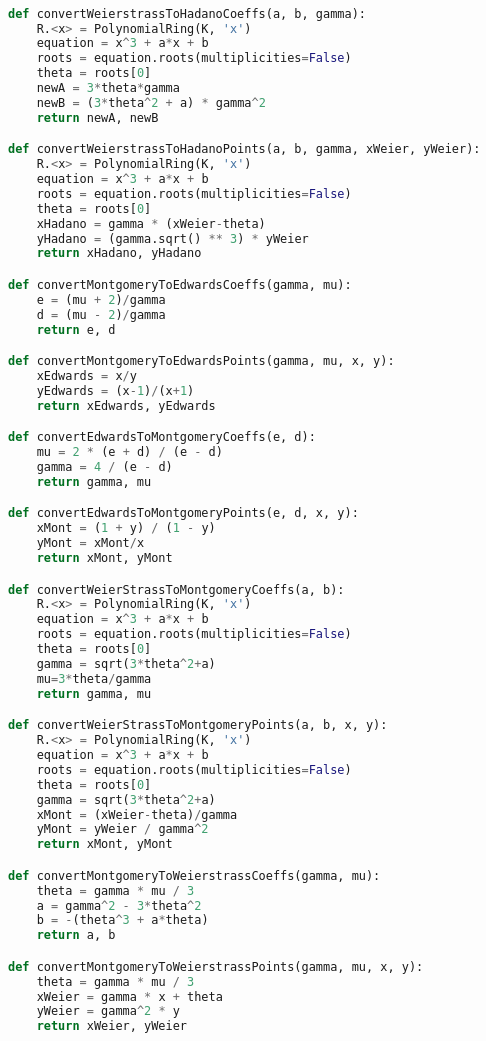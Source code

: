 \begin{lstlisting}[language=python]

def convertWeierstrassToHadanoCoeffs(a, b, gamma):
    R.<x> = PolynomialRing(K, 'x')
    equation = x^3 + a*x + b
    roots = equation.roots(multiplicities=False)
    theta = roots[0]
    newA = 3*theta*gamma
    newB = (3*theta^2 + a) * gamma^2
    return newA, newB

def convertWeierstrassToHadanoPoints(a, b, gamma, xWeier, yWeier):
    R.<x> = PolynomialRing(K, 'x')
    equation = x^3 + a*x + b
    roots = equation.roots(multiplicities=False)
    theta = roots[0]
    xHadano = gamma * (xWeier-theta)
    yHadano = (gamma.sqrt() ** 3) * yWeier
    return xHadano, yHadano

def convertMontgomeryToEdwardsCoeffs(gamma, mu):
    e = (mu + 2)/gamma
    d = (mu - 2)/gamma
    return e, d

def convertMontgomeryToEdwardsPoints(gamma, mu, x, y):
    xEdwards = x/y
    yEdwards = (x-1)/(x+1)
    return xEdwards, yEdwards

def convertEdwardsToMontgomeryCoeffs(e, d):
    mu = 2 * (e + d) / (e - d)
    gamma = 4 / (e - d)
    return gamma, mu

def convertEdwardsToMontgomeryPoints(e, d, x, y):
    xMont = (1 + y) / (1 - y)
    yMont = xMont/x
    return xMont, yMont

def convertWeierStrassToMontgomeryCoeffs(a, b):
    R.<x> = PolynomialRing(K, 'x')
    equation = x^3 + a*x + b
    roots = equation.roots(multiplicities=False)
    theta = roots[0]
    gamma = sqrt(3*theta^2+a)
    mu=3*theta/gamma
    return gamma, mu

def convertWeierStrassToMontgomeryPoints(a, b, x, y):
    R.<x> = PolynomialRing(K, 'x')
    equation = x^3 + a*x + b
    roots = equation.roots(multiplicities=False)
    theta = roots[0]
    gamma = sqrt(3*theta^2+a)
    xMont = (xWeier-theta)/gamma
    yMont = yWeier / gamma^2
    return xMont, yMont

def convertMontgomeryToWeierstrassCoeffs(gamma, mu):
    theta = gamma * mu / 3
    a = gamma^2 - 3*theta^2
    b = -(theta^3 + a*theta)
    return a, b

def convertMontgomeryToWeierstrassPoints(gamma, mu, x, y):
    theta = gamma * mu / 3
    xWeier = gamma * x + theta
    yWeier = gamma^2 * y
    return xWeier, yWeier

\end{lstlisting}